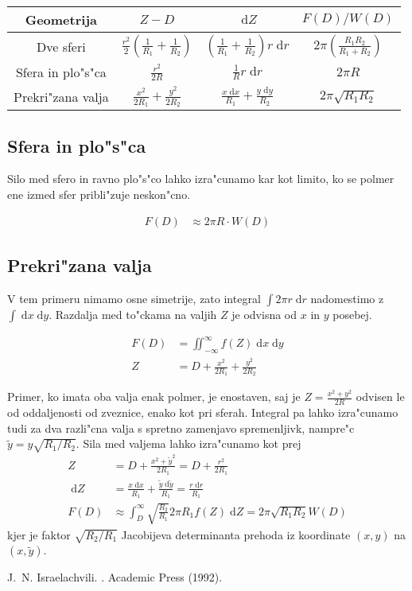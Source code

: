 \documentclass[a4paper,10pt]{article}
\newcommand{\dd}{\;\mathrm{d}}
\begin{document}
\begin{table}[h]
\begin{tabular}{c|c|c|c}
 Geometrija & $Z - D$ & $\dd Z$ & $F(D) / W(D)$ \\
 \hline
 Dve sferi & $\frac{r^2}{2} \left(\frac{1}{R_1} + \frac{1}{R_2}\right)$ & $\left(\frac{1}{R_1} + \frac{1}{R_2}\right)r \dd r$ & $2\pi \left(\frac{R_1R_2}{R_1 + R_2}\right)$ \\
 \hline
 Sfera in plo"s"ca & $\frac{r^2}{2R}$ & $\frac{1}{R} r \dd r$ & $2\pi R$ \\
 \hline
 Prekri"zana valja & $\frac{x^2}{2R_1} + \frac{y^2}{2R_2}$ & $\frac{x \dd x}{R_1} + \frac{y \dd y}{R_2}$ & $2\pi \sqrt{R_1R_2}$
\end{tabular}
\end{table}

\subsection{Sfera in plo"s"ca}

Silo med sfero in ravno plo"s"co lahko izra"cunamo kar kot limito, ko se polmer ene izmed sfer pribli"zuje neskon"cno. 

\begin{align}
 F(D) &\approx 2\pi R\cdot W(D)
\end{align}


\subsection{Prekri"zana valja}

V tem primeru nimamo osne simetrije, zato integral $\int 2\pi r \dd r$ nadomestimo z $\int \dd x \dd y$. 
Razdalja med to"ckama na valjih $Z$ je odvisna od $x$ in $y$ posebej. 

\begin{align}
 F(D) &= \iint_{-\infty}^{\infty} f(Z) \dd x \dd y \\
 Z &= D + \frac{x^2}{2R_1} + \frac{y^2}{2R_2}
\end{align}

Primer, ko imata oba valja enak polmer, je enostaven, saj je $Z = \frac{x^2 + y^2}{2R}$ odvisen le od oddaljenosti od zveznice, enako kot pri sferah. 
Integral pa lahko izra"cunamo tudi za dva razli"cna valja s spretno zamenjavo spremenljivk, nampre"c $\tilde y = y\sqrt{R_1/R_2}$. 
Sila med valjema lahko izra"cunamo kot prej
\begin{align}
 Z &= D + \frac{x^2 + \tilde y^2}{2R_1} = D + \frac{r^2}{2R_1} \\
 \dd Z &= \frac{x \dd x}{R_1} + \frac{\tilde y \dd \tilde y}{R_1} = \frac{r \dd r}{R_1} \\
 F(D) &\approx \int_D^{\infty} \sqrt{\frac{R_2}{R_1}} 2\pi R_1 f(Z) \dd Z = 2\pi \sqrt{R_1 R_2} W(D) 
\end{align}
kjer je faktor $\sqrt{R_2/R_1}$ Jacobijeva determinanta prehoda iz koordinate $(x, y)$ na $(x, \tilde y)$. 

\begin{thebibliography}{10}

J.~N. Israelachvili.
.
\newblock Academic Press (1992).



\end{thebibliography}
\end{document}
